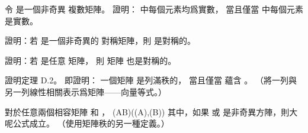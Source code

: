 \startANSWER
{}
\stopANSWER

\startEXERCISE
令  是一個非奇異  複數矩陣。
證明：  中每個元素均爲實數，
當且僅當  中每個元素是實數。
\stopEXERCISE

\startANSWER
{}
\stopANSWER

\startEXERCISE
證明：若  是一個非奇異的  對稱矩陣，則  是對稱的。

證明：若  是任意  矩陣，
則  矩陣  也是對稱的。
\stopEXERCISE

\startANSWER
{}
\stopANSWER

\startEXERCISE
證明定理 D.2。
即證明：
一個矩陣  是列滿秩的，
當且僅當  蘊含 。
（\hint 將一列與另一列線性相關表示爲矩陣——向量等式。）
\stopEXERCISE

\startANSWER
{}
\stopANSWER

\startEXERCISE
對於任意兩個相容矩陣  和 ，
\startformula
\rank(AB)\le \min(\rank(A),\rank(B))
\stopformula
其中，如果  或  是非奇異方陣，則大呢公式成立。
（\hint 使用矩陣秩的另一種定義。）
\stopEXERCISE

\startANSWER
{}
\stopANSWER

\stopsection
